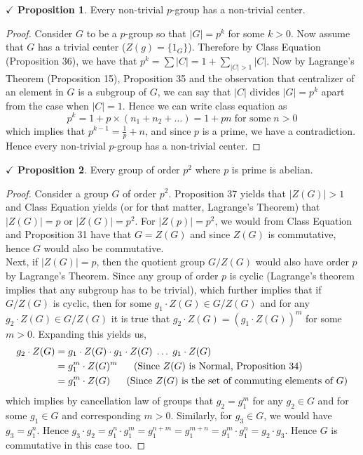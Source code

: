 \documentclass{article}
\theoremstyle{definition}
\theoremstyle{remark}
\theoremstyle{definition}
\theoremstyle{definition}
\newtheorem{proposition}{$\checkmark$ Proposition}
\theoremstyle{definition}
\theoremstyle{proof}
\newcommand{\order}[1]{\left\vert #1 \right\vert}
\begin{document}
\hrulefill
\begin{proposition}
	Every non-trivial $ p $-group has a non-trivial center.
\end{proposition}
\begin{proof}
	Consider $ G $ to be a $ p $-group so that $ \order{G} = p^k $ for some $ k>0 $. Now assume that $ G $ has a trivial center ($ Z(g) = \{1_G\} $). Therefore by Class Equation (Proposition 36), we have that $ p^{k}=\sum \order{C} = 1 + \sum_{\order{C}>1} \order{C} $. Now by Lagrange's Theorem (Proposition 15), Proposition 35 and the observation that centralizer of an element in $ G $ is a subgroup of $ G $, we can say that $ \order{C} $ divides $ \order{G} = p^k$ apart from the case when $ \order{C} = 1 $. Hence we can write class equation as 
	\[p^k = 1 + p \times (n_1 + n_2 + \dots) = 1+ pn \;\text{for some}\;n>0\]
	which implies that $ p^{k-1} = \frac{1}{p} + n $, and since $ p $ is a prime, we have a contradiction. Hence every non-trivial $ p $-group has a non-trivial center. 
\end{proof}
\hrulefill
\begin{proposition}
	Every group of order $ p^2 $ where $ p $ is prime is abelian.
\end{proposition}
\begin{proof}
	Consider a group $ G $ of order $ p^2 $. Proposition 37 yields that $ \order{Z(G)} > 1 $ and Class Equation yields (or for that matter, Lagrange's Theorem) that $ \order{Z(G)} = p $ or $ \order{Z(G)} = p^2 $. For $ \order{Z(p)} = p^2 $, we would from Class Equation and Proposition 31 have that $ G =  Z(G)$ and since $ Z(G) $ is commutative, hence $ G $ would also be commutative. \\
	Next, if $ \order{Z(G)} = p $, then the quotient group $ G/Z(G) $ would also have order $ p $ by Lagrange's Theorem. Since any group of order $ p $ is cyclic (Lagrange's theorem implies that any subgroup has to be trivial), which further implies that if $ G/Z(G) $ is cyclic, then for some $ g_1\cdot Z(G) \in G/Z(G) $ and for any $ g_2\cdot Z(G) \in G/Z(G) $ it is true that $ g_2\cdot Z(G) = \left( g_1\cdot  Z(G)\right )^m $ for some $ m >0$. Expanding this yields us, 
	\begin{equation*}
		\begin{split}
			g_2\cdot Z(G) &= g_1\cdot Z(G)\cdot g_1\cdot Z(G) \;\dots \; g_1\cdot Z(G)\\
			&= g_1^m\cdot Z(G)^m \;\;\;\;\;\;\text{(Since $ Z(G) $ is Normal, Proposition 34)}\\
			&= g_1^m\cdot Z(G) \;\;\;\;\;\;\text{(Since $ Z(G) $ is the set of commuting elements of $ G $)}\\
		\end{split}
	\end{equation*} 
which implies by cancellation law of groups that $ g_2 = g_1^m $ for any $ g_2\in G $ and for some $ g_1\in G $ and corresponding $ m>0 $. Similarly, for $ g_3\in G $, we would have $ g_3 = g_1^n $. Hence $ g_3\cdot g_2 = g_1^n\cdot g_1^m = g_1^{n+m} = g_1^{m+n} = g_1^m\cdot g_1^n = g_2\cdot g_3 $. Hence $ G $ is commutative in this case too.
\end{proof}
\hrulefill
\newpage
\end{document}
